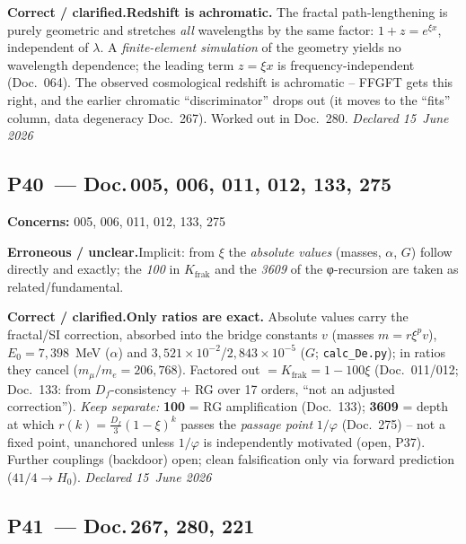 \smallskip\noindent\textbf{Correct / clarified.}\quad \textbf{Redshift is achromatic.} The fractal path-lengthening is purely geometric and stretches \emph{all} wavelengths by the same factor: $1+z=e^{\xi x}$, independent of $\lambda$. A \emph{finite-element simulation} of the geometry yields no wavelength dependence; the leading term $z=\xi x$ is frequency-independent (Doc.~064). The observed cosmological redshift is achromatic -- FFGFT gets this right, and the earlier chromatic \enquote{discriminator} drops out (it moves to the \enquote{fits} column, data degeneracy Doc.~267). Worked out in Doc.~280. \emph{Declared 15~June 2026}


\medskip


\subsection*{P40~--- Doc.\,005, 006, 011, 012, 133, 275}

\noindent\textbf{Concerns:} 005, 006, 011, 012, 133, 275


\smallskip\noindent\textbf{Erroneous / unclear.}\quad Implicit: from $\xi$ the \emph{absolute values} (masses, $\alpha$, $G$) follow directly and exactly; the \emph{100} in $K_{\text{frak}}$ and the \emph{3609} of the φ-recursion are taken as related/fundamental.


\smallskip\noindent\textbf{Correct / clarified.}\quad \textbf{Only ratios are exact.} Absolute values carry the fractal/SI correction, absorbed into the bridge constants $v$ (masses $m=r\xi^p v$), $E_0=7{,}398$~MeV ($\alpha$) and $3{,}521\times10^{-2}$/$2{,}843\times10^{-5}$ ($G$; \texttt{calc\_De.py}); in ratios they cancel ($m_\mu/m_e=206{,}768$). Factored out $=K_{\text{frak}}=1-100\xi$ (Doc.~011/012; Doc.~133: from $D_f$-consistency + RG over 17 orders, ``not an adjusted correction''). \emph{Keep separate:} \textbf{100} = RG amplification (Doc.~133); \textbf{3609} = depth at which $r(k)=\tfrac{D_f}{3}(1-\xi)^k$ passes the \emph{passage point} $1/\varphi$ (Doc.~275) -- not a fixed point, unanchored unless $1/\varphi$ is independently motivated (open, P37). Further couplings (backdoor) open; clean falsification only via forward prediction ($41/4\to H_0$). \emph{Declared 15~June 2026}


\medskip


\subsection*{P41~--- Doc.\,267, 280, 221}

